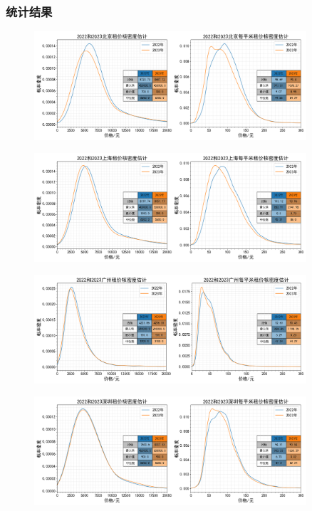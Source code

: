 \documentclass[lang=cn,11pt,a4paper]{elegantpaper}
\begin{document}
\subsubsection{统计结果}

\begin{figure}[H]
    \centering
    \includegraphics[width=0.9\textwidth]{image/2022和2023北京租金分布对比.png}
\end{figure}

\begin{figure}[H]
    \centering
    \includegraphics[width=0.9\textwidth]{image/2022和2023上海租金分布对比.png}
\end{figure}

\begin{figure}[H]
    \centering
    \includegraphics[width=0.9\textwidth]{image/2022和2023广州租金分布对比.png}
\end{figure}

\begin{figure}[H]
    \centering
    \includegraphics[width=0.9\textwidth]{image/2022和2023深圳租金分布对比.png}
\end{figure}
\end{document}
